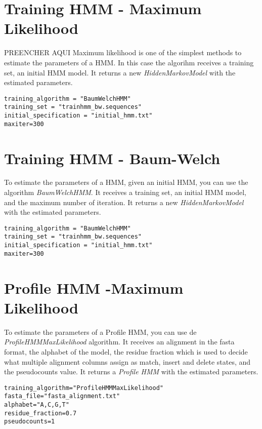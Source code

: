 \section{Training HMM - Maximum Likelihood}
{\huge{PREENCHER AQUI}}
Maximum likelihood is one of the simplest methods to estimate the parameters of a HMM.  In this case the algorihm receives a training set, an initial HMM model. It returns a new \textit{HiddenMarkovModel} with the estimated parameters.

\begin{Verbatim}[frame=single, label=train.txt]
training_algorithm = "BaumWelchHMM"
training_set = "trainhmm_bw.sequences"
initial_specification = "initial_hmm.txt"
maxiter=300
\end{Verbatim}


\section{Training HMM - Baum-Welch}

To estimate the parameters of a HMM, given an initial HMM, you can use the algorithm \textit{BaumWelchHMM}. It receives a training set, an initial HMM model, and the maximum number of iteration. It returns a new \textit{HiddenMarkovModel} with the estimated parameters.

\begin{Verbatim}[frame=single, label=train.txt]
training_algorithm = "BaumWelchHMM"
training_set = "trainhmm_bw.sequences"
initial_specification = "initial_hmm.txt"
maxiter=300
\end{Verbatim}



\section{Profile HMM -Maximum Likelihood}
To estimate the parameters of a Profile HMM, you can use de \textit{ProfileHMMMaxLikelihood} algorithm. It receives an alignment in the fasta format, the alphabet of the model, the residue fraction which is used to decide what multiple alignment columns assign as match, insert and delete states, and the pseudocounts value. It returns a \textit{Profile HMM} with the estimated parameters.

\begin{Verbatim}[frame=single,label=train.txt]
training_algorithm="ProfileHMMMaxLikelihood"
fasta_file="fasta_alignment.txt"
alphabet="A,C,G,T"
residue_fraction=0.7
pseudocounts=1
\end{Verbatim}



